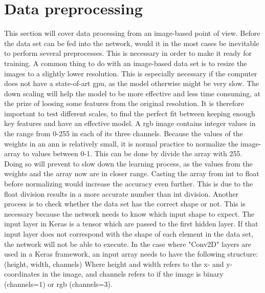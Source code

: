 \documentclass[USenglish]{ifimaster}  %
\begin{document}
\section{Data preprocessing}
This section will cover data processing from an image-based point of view. Before the data set can be fed into the network, would it in the most cases be inevitable to perform several preprocesses. This is necessary in order to make it ready for training. 
\newline
A common thing to do with an image-based data set is to resize the images to a slightly lower resolution. This is especially necessary if the computer does not have a state-of-art \ac{gpu}, as the model otherwise might be very slow. The down scaling will help the model to be more effective and less time consuming, at the prize of loosing some features from the original resolution. It is therefore important to test different scales, to find the perfect fit between keeping enough key features and have an effective model.
\newline
A \ac{rgb} image contains integer values in the range from 0-255 in each of its three channels. Because the values of the weights in an \ac{ann} is relatively small, it is normal practice to normalize the image-array to values between 0-1. This can be done by divide the array with 255. Doing so will prevent to slow down the learning process, as the values from the weights and the array now are in closer range. Casting the array from int to float before normalizing would increase the accuracy even further. This is due to the float division results in a more accurate number than int division. 
\newline
\newline
Another process is to check whether the data set has the correct shape or not. This is necessary because the network needs to know which input shape to expect. The input layer in Keras is a tensor which are passed to the first hidden layer. If that input layer does not correspond with the shape of each element in the data set, the network will not be able to execute. In the case where "Conv2D" layers are used in a Keras framework, an input array needs to have the following structure:
\newline
\newline
(height, width, channels)
\newline
\newline
Where height and width refers to the x- and y-coordinates in the image, and channels refers to if the image is binary (channels=1) or \ac{rgb} (channels=3).
\end{document}
